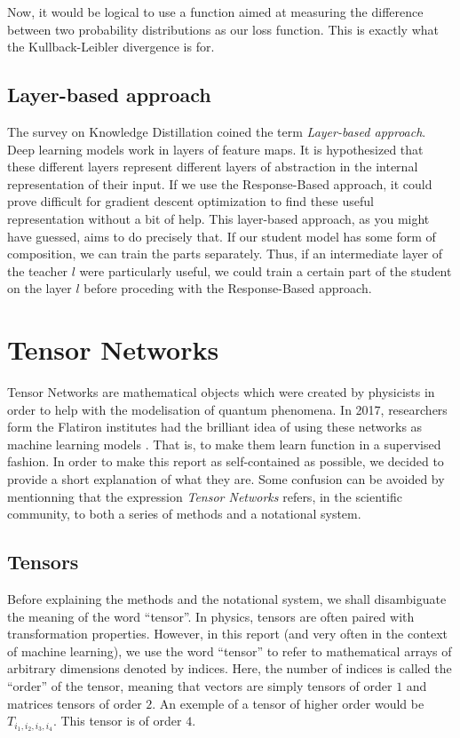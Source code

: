 \documentclass{article}
\theoremstyle{definition}
\theoremstyle{definition}
\begin{document}
Now, it would be logical to use a function aimed at measuring the difference between two probability distributions as our loss function. This is exactly what the Kullback-Leibler divergence is for.

\subsection{Layer-based approach}
The survey on Knowledge Distillation coined the term {\it Layer-based approach}.
Deep learning models work in layers of feature maps. It is hypothesized that
these different layers represent different layers of abstraction in the internal
representation of their input. If we use the Response-Based approach, it could prove difficult for gradient descent optimization to find these useful representation without a bit of help. This layer-based approach, as you might have guessed, aims to do precisely that. If our student model has some form of composition, we can train the parts separately. Thus, if an intermediate layer of the teacher $l$ were particularly useful, we could train a certain part of the student on the layer $l$ before proceding with the Response-Based approach.



\section{Tensor Networks}
Tensor Networks are mathematical objects which were created by physicists in order to help with the modelisation of quantum phenomena.
In 2017, researchers form the Flatiron institutes had the brilliant idea of using these networks as machine learning models \cite{stoudenmire2017supervised}. That is, to make them learn function in a supervised fashion. In order to make this report as self-contained as possible, we decided to provide a short explanation of what they are. Some confusion can be avoided by mentionning that the expression \emph{Tensor Networks} refers, in the scientific community, to both a series of methods and a notational system.

\subsection{Tensors}
Before explaining the methods and the notational system, we shall disambiguate the meaning of the word \enquote{tensor}. In physics, tensors are often paired with transformation properties. 
However, in this report (and very often in the context of machine learning), we use the word \enquote{tensor} to refer to mathematical arrays of arbitrary dimensions denoted by indices. Here, the number of indices is called the \enquote{order} of the tensor, meaning that vectors are simply tensors of order $1$ and matrices tensors of order $2$. An exemple of a tensor of higher order would be $T_{i_1,i_2,i_3,i_4}$. This tensor is of order $4$.
\end{document}
